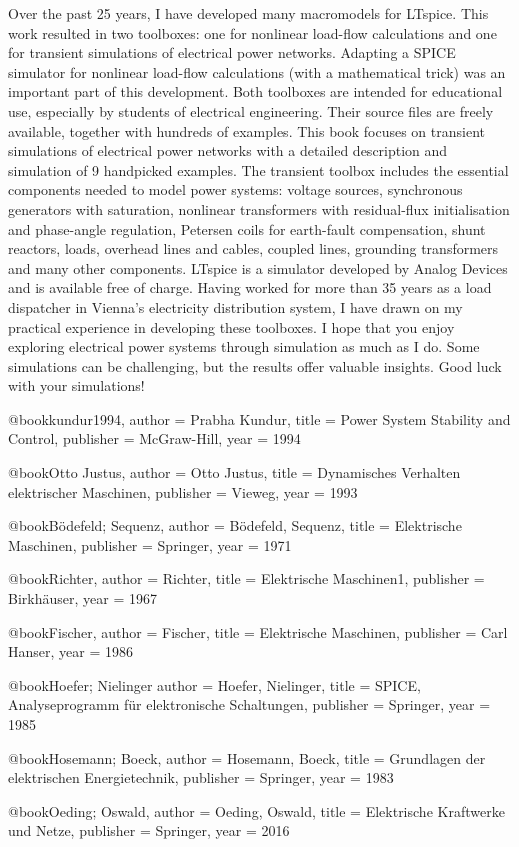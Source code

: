 \printbibliography[heading=bibintoc,title={References}]
Over the past 25 years, I have developed many macromodels for LTspice. This work resulted in two toolboxes: one for nonlinear load-flow calculations and one for transient simulations of electrical power networks. Adapting a SPICE simulator for nonlinear load-flow calculations  (with a mathematical trick) was an important part of this development.
Both toolboxes are intended for educational use, especially by students of electrical engineering. Their source files are freely available, together with hundreds of examples. This book focuses on transient simulations of electrical power networks with a detailed description and simulation of 9 handpicked examples.
The transient toolbox includes the essential components needed to model power systems: voltage sources, synchronous generators with saturation, nonlinear transformers with residual-flux initialisation and phase-angle regulation, Petersen coils for earth-fault compensation, shunt reactors, loads, overhead lines and cables, coupled lines, grounding transformers and many other components.
LTspice is a simulator developed by Analog Devices and is available free of charge. Having worked for more than 35 years as a load dispatcher in Vienna’s electricity distribution system, I have drawn on my practical experience in developing these toolboxes.
I hope that you enjoy exploring electrical power systems through simulation as much as I do. Some simulations can be challenging, but the results offer valuable insights. Good luck with your simulations!



@book{kundur1994,
	author    = {Prabha Kundur},
	title     = {Power System Stability and Control},
	publisher = {McGraw-Hill},
	year      = {1994}
}

@book{Otto Justus,
	author    = {Otto Justus},
	title     = {Dynamisches Verhalten elektrischer Maschinen},
	publisher = {Vieweg},
	year      = {1993}
}


@book{Bödefeld; Sequenz,
	author    = {Bödefeld, Sequenz},
	title     = {Elektrische Maschinen},
	publisher = {Springer},
	year      = {1971}
}

@book{Richter,
	author    = {Richter},
	title     = {Elektrische Maschinen1},
	publisher = {Birkhäuser},
	year      = {1967}
}

@book{Fischer,
	author    = {Fischer},
	title     = {Elektrische Maschinen},
	publisher = {Carl Hanser},
	year      = {1986}	
}

@book{Hoefer; Nielinger
	author    = {Hoefer, Nielinger},
	title     = {SPICE, Analyseprogramm für elektronische Schaltungen},
	publisher = {Springer},
	year      = {1985}		
}

@book{Hosemann; Boeck,
	author    = {Hosemann, Boeck},
	title     = {Grundlagen der elektrischen Energietechnik},
	publisher = {Springer},
	year      = {1983}		
}

@book{Oeding; Oswald,
	author    = {Oeding, Oswald},
	title     = {Elektrische Kraftwerke und Netze},
	publisher = {Springer},
	year      = {2016}		
}



\cleardoublepage
